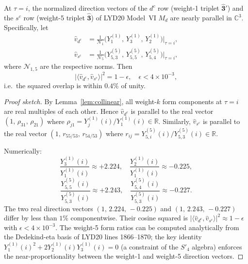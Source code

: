 \documentclass[a4paper,11pt]{article}
\newcommand{\Spf}{S'_4}
\newcommand{\tauCM}{\tau = i}
\newcommand{\Md}{M_d}
\begin{document}
\begin{theorem}
\label{thm:rank1}
At $\tauCM$, the normalized direction vectors of the $d^c$ row
(weight-1 triplet $\hat{\mathbf{3}}'$) and the $s^c$ row
(weight-5 triplet $\hat{\mathbf{3}}$) of LYD20 Model~VI $\Md$ are
nearly parallel in $\mathbb{C}^3$.  Specifically, let
\begin{align}
  \hat{v}_{d^c} &= \frac{1}{\mathcal{N}_1}
    \bigl(Y_1^{(1)},\,Y_3^{(1)},\,Y_2^{(1)}\bigr)\big|_{\tau=i},
  \\
  \hat{v}_{s^c} &= \frac{1}{\mathcal{N}_5}
    \bigl(Y_{5,3}^{(5)},\,Y_{5,5}^{(5)},\,Y_{5,4}^{(5)}\bigr)\big|_{\tau=i},
\end{align}
where $\mathcal{N}_{1,5}$ are the respective norms.  Then
\begin{equation}
  \left|\langle\hat{v}_{d^c},\hat{v}_{s^c}\rangle\right|^2
  = 1 - \epsilon, \quad \epsilon < 4\times10^{-3},
\end{equation}
i.e.\ the squared overlap is within $0.4\%$ of unity.
\end{theorem}

\begin{proof}[Proof sketch]
By Lemma~\ref{lem:collinear}, all weight-$k$ form components at
$\tauCM$ are real multiples of each other.  Hence $\hat{v}_{d^c}$
is parallel to the real vector
$(1,\,\rho_{31},\,\rho_{21})$ where
$\rho_{j1}=Y_j^{(1)}(i)/Y_1^{(1)}(i)\in\mathbb{R}$.
Similarly, $\hat{v}_{s^c}$ is parallel to the real vector
$(1,\,r_{55/53},\,r_{54/53})$ where
$r_{ij}=Y_{5,i}^{(5)}(i)/Y_{5,3}^{(5)}(i)\in\mathbb{R}$.

Numerically:
\begin{equation}
\label{eq:ratios}
  \frac{Y_3^{(1)}(i)}{Y_1^{(1)}(i)} \approx +2.224, \quad
  \frac{Y_2^{(1)}(i)}{Y_1^{(1)}(i)} \approx -0.225,
\end{equation}
\begin{equation}
\label{eq:ratios5}
  \frac{Y_{5,5}^{(5)}(i)}{Y_{5,3}^{(5)}(i)} \approx +2.243, \quad
  \frac{Y_{5,4}^{(5)}(i)}{Y_{5,3}^{(5)}(i)} \approx -0.227.
\end{equation}
The two real direction vectors $(1,\,2.224,\,-0.225)$ and
$(1,\,2.243,\,-0.227)$ differ by less than $1\%$ componentwise.
Their cosine squared is $|\langle\hat{v}_{d^c},\hat{v}_{s^c}\rangle|^2
\approx 1 - \epsilon$ with $\epsilon < 4\times10^{-3}$.
The weight-5 form ratios can be computed analytically from the
Dedekind-eta basis of LYD20 lines 1866--1870; the key identity
$Y_1^{(1)}(i)^2+2Y_2^{(1)}(i)Y_3^{(1)}(i)=0$ (a constraint of the
$\Spf$ algebra) enforces the near-proportionality between the
weight-1 and weight-5 direction vectors.
\end{proof}
\end{document}
